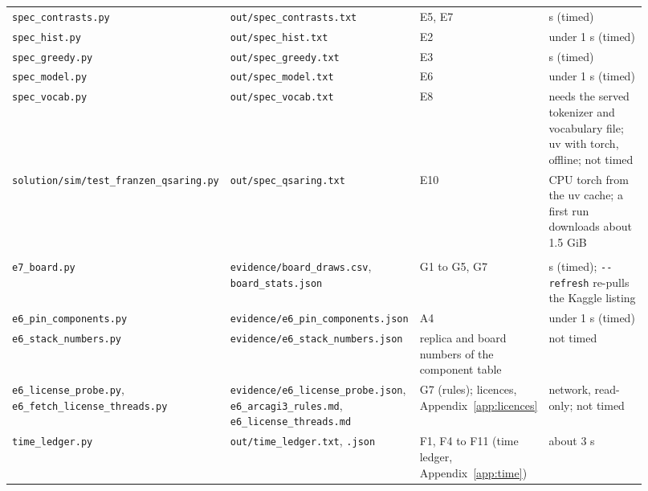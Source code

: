 {\begin{longtable}{@{}>{\raggedright\arraybackslash}p{0.25\linewidth}>{\raggedright\arraybackslash}p{0.27\linewidth}>{\raggedright\arraybackslash}p{0.2\linewidth}>{\raggedright\arraybackslash}p{0.2\linewidth}@{}}
\texttt{spec\_\allowbreak{}contrasts.py} & \texttt{out/\allowbreak{}spec\_\allowbreak{}contrasts.txt} & E5, E7 & 58 s (timed) \\ %
\texttt{spec\_\allowbreak{}hist.py} & \texttt{out/\allowbreak{}spec\_\allowbreak{}hist.txt} & E2 & under 1 s (timed) \\ %
\texttt{spec\_\allowbreak{}greedy.py} & \texttt{out/\allowbreak{}spec\_\allowbreak{}greedy.txt} & E3 & 1 s (timed) \\ %
\texttt{spec\_\allowbreak{}model.py} & \texttt{out/\allowbreak{}spec\_\allowbreak{}model.txt} & E6 & under 1 s (timed) \\ %
\texttt{spec\_\allowbreak{}vocab.py} & \texttt{out/\allowbreak{}spec\_\allowbreak{}vocab.txt} & E8 & needs the served tokenizer and vocabulary file; uv with torch, offline; not timed \\ %
\texttt{solution/\allowbreak{}sim/\allowbreak{}test\_\allowbreak{}franzen\_\allowbreak{}qsaring.py} & \texttt{out/\allowbreak{}spec\_\allowbreak{}qsaring.txt} & E10 & CPU torch from the uv cache; a first run downloads about 1.5 GiB \\ %
\midrule
\multicolumn{4}{@{}p{0.96\linewidth}}{\textit{Leaderboard, components, time and figures}} \\*
\texttt{e7\_\allowbreak{}board.py} & \texttt{evidence/\allowbreak{}board\_\allowbreak{}draws.csv}, \texttt{board\_\allowbreak{}stats.json} & G1 to G5, G7 & 1 s (timed); \texttt{-{}-refresh} re-pulls the Kaggle listing \\ %
\texttt{e6\_\allowbreak{}pin\_\allowbreak{}components.py} & \texttt{evidence/\allowbreak{}e6\_\allowbreak{}pin\_\allowbreak{}components.json} & A4 & under 1 s (timed) \\ %
\texttt{e6\_\allowbreak{}stack\_\allowbreak{}numbers.py} & \texttt{evidence/\allowbreak{}e6\_\allowbreak{}stack\_\allowbreak{}numbers.json} & replica and board numbers of the component table & not timed \\ %
\texttt{e6\_\allowbreak{}license\_\allowbreak{}probe.py}, \texttt{e6\_\allowbreak{}fetch\_\allowbreak{}license\_\allowbreak{}threads.py} & \texttt{evidence/\allowbreak{}e6\_\allowbreak{}license\_\allowbreak{}probe.json}, \texttt{e6\_\allowbreak{}arcagi3\_\allowbreak{}rules.md}, \texttt{e6\_\allowbreak{}license\_\allowbreak{}threads.md} & G7 (rules); licences, Appendix~\ref{app:licences} & network, read-only; not timed \\ %
\texttt{time\_\allowbreak{}ledger.py} & \texttt{out/\allowbreak{}time\_\allowbreak{}ledger.txt}, \texttt{.json} & F1, F4 to F11 (time ledger, Appendix~\ref{app:time}) & about 3 s \\ %

\end{longtable}}
